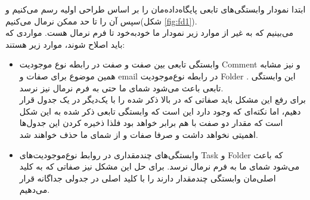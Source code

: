 \documentclass{article}
\begin{document}
ابتدا نمودار وابستگی‌های تابعی پایگاه‌داده‌مان را بر اساس طراحی اولیه رسم می‌کنیم و سپس آن را تا حد ممکن نرمال می‌کنیم(شکل \ref{fig:fd1}).
\\
می‌بینیم که به غیر از موارد زیر نمودار ما خود‌به‌خود تا فرم نرمال  هست. مواردی که باید اصلاح شوند، موارد زیر هستند:
\\
\begin{itemize}

\item وابستگی تابعی بین صفت
و صفت
در رابطه نوع موجودیت Comment و نیز مشابه همین موضوع برای صفات
و email در رابطه نوع‌موجودیت Folder . این وابستگی تابعی باعث می‌شود شمای ما حتی به فرم نرمال  نیز نرسد.
\\
برای رفع این مشکل باید صفاتی که در بالا ذکر شده را با یک‌دیگر در یک جدول قرار دهیم، اما نکته‌ای که وجود دارد این است که وابستگی تابعی ذکر شده به این شکل است که مقدار دو صفت با هم برابر خواهد بود فلذا ذخیره کردن این جدول‌ها اهمیتی نخواهد داشت و صرفا صفات
و
از شمای ما حذف خواهند شد.

\item وابستگی‌های چندمقداری در روابط نوع‌موجودیت‌های Task و Folder که باعث می‌شود شمای ما به فرم نرمال  نرسد. برای حل این مشکل نیز صفاتی که به کلید اصلی‌مان وابستگی چندمقدار دارند را با کلید اصلی در جدولی جداگانه قرار می‌دهیم.

\end{itemize}
\end{document}

